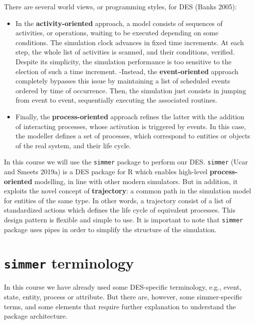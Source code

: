 \documentclass[
]{book}
\providecommand{\tightlist}{%
  \setlength{\itemsep}{0pt}\setlength{\parskip}{0pt}}
\begin{document}
There are several world views, or programming styles, for DES (Banks 2005):

\begin{itemize}
\tightlist
\item
  In the \textbf{activity-oriented} approach, a model consists of sequences of activities, or operations, waiting to be executed depending on some conditions. The simulation clock advances in fixed time increments. At each step, the whole list of activities is scanned, and their conditions, verified. Despite its simplicity, the simulation performance is too sensitive to the election of such a time increment.
  -Instead, the \textbf{event-oriented} approach completely bypasses this issue by maintaining a list of scheduled events ordered by time of occurrence. Then, the simulation just consists in jumping from event to event, sequentially executing the associated routines.
\item
  Finally, the \textbf{process-oriented} approach refines the latter with the addition of interacting processes, whose activation is triggered by events. In this case, the modeller defines a set of processes, which correspond to entities or objects of the real system, and their life cycle.
\end{itemize}

In this course we will use the \texttt{simmer} package to perform our DES. \texttt{simmer} (Ucar and Smeets 2019a) is a DES package for R which enables high-level \textbf{process-oriented} modelling, in line with other modern simulators. But in addition, it exploits the novel concept of \textbf{trajectory}: a common path in the simulation model for entities of the same type. In other words, a trajectory consist of a list of standardized actions which defines the life cycle of equivalent processes. This design pattern is flexible and simple to use. It is important to note that \texttt{simmer} package uses pipes in order to simplify the structure of the simulation.

\hypertarget{simmer-terminology}{%
\section{\texorpdfstring{\texttt{simmer} terminology}{simmer terminology}}\label{simmer-terminology}}

In this course we have already used some DES-specific terminology, e.g., event, state, entity, process or attribute. But there are, however, some simmer-specific terms, and some elements that require further explanation to understand the package architecture.
\end{document}
